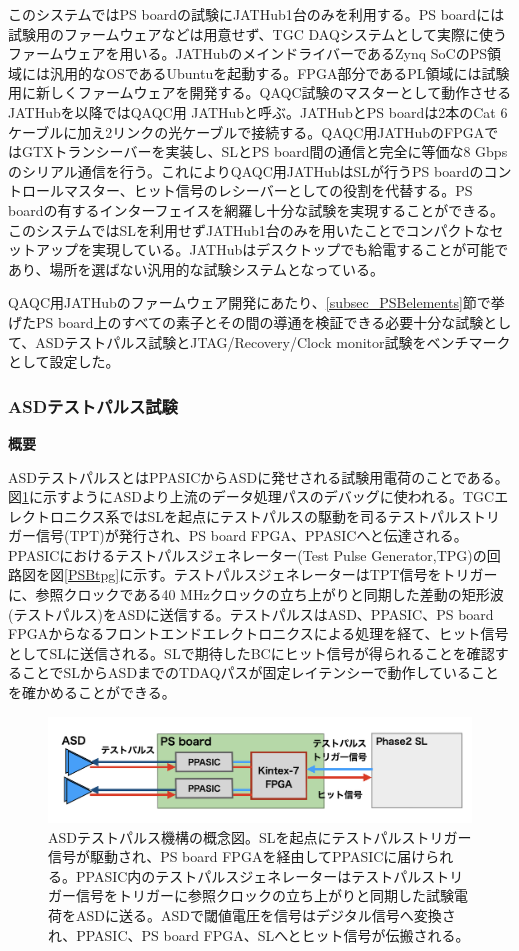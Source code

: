 このシステムではPS boardの試験にJATHub1台のみを利用する。PS boardには試験用のファームウェアなどは用意せず、TGC DAQシステムとして実際に使うファームウェアを用いる。JATHubのメインドライバーであるZynq SoCのPS領域には汎用的なOSであるUbuntuを起動する。FPGA部分であるPL領域には試験用に新しくファームウェアを開発する。QAQC試験のマスターとして動作させるJATHubを以降ではQAQC用 JATHubと呼ぶ。JATHubとPS boardは2本のCat 6ケーブルに加え2リンクの光ケーブルで接続する。QAQC用JATHubのFPGAではGTXトランシーバーを実装し、SLとPS board間の通信と完全に等価な8 Gbpsのシリアル通信を行う。これによりQAQC用JATHubはSLが行うPS boardのコントロールマスター、ヒット信号のレシーバーとしての役割を代替する。PS boardの有するインターフェイスを網羅し十分な試験を実現することができる。このシステムではSLを利用せずJATHub1台のみを用いたことでコンパクトなセットアップを実現している。JATHubはデスクトップでも給電することが可能であり、場所を選ばない汎用的な試験システムとなっている。\par

QAQC用JATHubのファームウェア開発にあたり、\ref{subsec_PSBelements}節で挙げたPS board上のすべての素子とその間の導通を検証できる必要十分な試験として、ASDテストパルス試験とJTAG/Recovery/Clock monitor試験をベンチマークとして設定した。

\subsubsection{ASDテストパルス試験}
\label{subsubsec_testpulse}
\textbf{概要}\par
ASDテストパルスとはPPASICからASDに発せされる試験用電荷のことである。
図\ref{PSBasdtp}に示すようにASDより上流のデータ処理パスのデバッグに使われる。TGCエレクトロニクス系ではSLを起点にテストパルスの駆動を司るテストパルストリガー信号(TPT)が発行され、PS board FPGA、PPASICへと伝達される。PPASICにおけるテストパルスジェネレーター(Test Pulse Generator,TPG)の回路図を図\ref{PSBtpg}に示す。テストパルスジェネレーターはTPT信号をトリガーに、参照クロックである40 MHzクロックの立ち上がりと同期した差動の矩形波(テストパルス)をASDに送信する。テストパルスはASD、PPASIC、PS board FPGAからなるフロントエンドエレクトロニクスによる処理を経て、ヒット信号としてSLに送信される。SLで期待したBCにヒット信号が得られることを確認することでSLからASDまでのTDAQパスが固定レイテンシーで動作していることを確かめることができる。
\baselineskip
\begin{figure} 
\centering
\includegraphics[width=16cm]{fig/QAQC/PSBasdtp.png}
\caption[ASDテストパルスの概念図]{ASDテストパルス機構の概念図。SLを起点にテストパルストリガー信号が駆動され、PS board FPGAを経由してPPASICに届けられる。PPASIC内のテストパルスジェネレーターはテストパルストリガー信号をトリガーに参照クロックの立ち上がりと同期した試験電荷をASDに送る。ASDで閾値電圧を信号はデジタル信号へ変換され、PPASIC、PS board FPGA、SLへとヒット信号が伝搬される。}
\label{PSBasdtp}
\end{figure}


